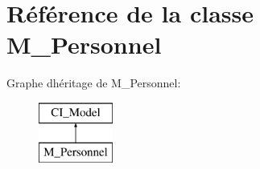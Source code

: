 \hypertarget{class_m___personnel}{}\section{Référence de la classe M\+\_\+\+Personnel}
\label{class_m___personnel}
Graphe d\textquotesingle{}héritage de M\+\_\+\+Personnel\+:\begin{figure}[H]
\begin{center}
\leavevmode
\includegraphics[height=2.000000cm]{class_m___personnel}
\end{center}
\end{figure}
